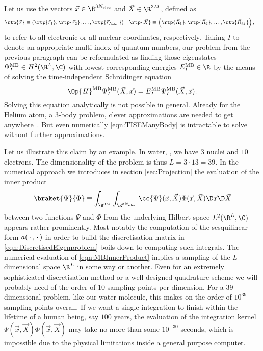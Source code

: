 Let us use the vectors $\vec{x} \in \R^{3\Nelec}$ and $\vec{X} \in \R^{3M}$, defined as
\begin{align}
	\rtp{\vec{x}} &\equiv \left(\rtp{\vec{r}_1}, \rtp{\vec{r}_2}, \ldots, \rtp{\vec{r}_{\Nelec}}\right)
	&
	\rtp{\vec{X}} &\equiv \left(\rtp{\vec{R}_1}, \rtp{\vec{R}_2}, \ldots, \rtp{\vec{R}_{M}}\right),
	\label{eqn:DefAllCoords}
\end{align}
to refer to all electronic or all nuclear coordinates, respectively.
Taking $I$ to denote an appropriate multi-index of quantum numbers,
our problem from the previous paragraph can be reformulated
as finding those eigenstates $\Psi^\text{MB}_I \in H^2(\R^L, \C)$
with lowest corresponding energies $E^\text{MB}_I \in \R$
by the means of solving the time-independent Schrödinger equation
\begin{equation}
	\Op{H}^\text{MB} \Psi_I^\text{MB}(\vec{X}, \vec{x})
	= E_I^\text{MB} \Psi_I^\text{MB}(\vec{X}, \vec{x}).
	\label{eqn:TISEManyBody}
\end{equation}
Solving this equation analytically is not possible in general.
Already for the Helium atom, a 3-body problem, clever approximations are needed
to get anywhere~\cite{Hylleraas1929}.
But even numerically \eqref{eqn:TISEManyBody} is intractable to solve
without further approximations.

Let us illustrate this claim by an example.
In water, , we have $3$ nuclei and $10$ electrons.
The dimensionality of the problem is thus $L = 3 \cdot 13 = 39$.
In the numerical approach we introduces in section \vref{sec:Projection}
the evaluation of the inner product
\begin{equation}
	\braket{\Psi}{\Phi} \equiv \int_{\R^{3M}} \int_{\R^{3\Nelec}}
		\cc{\Psi}(\vec{x}, \vec{X}) \Phi(\vec{x}, \vec{X})
	\D \vec{x} \D \vec{X}
	\label{eqn:MBInnerProduct}
\end{equation}
between two functions $\Psi$ and $\Phi$ from the
underlying Hilbert space $L^2(\R^L, \C)$ appears rather prominently.
Most notably the computation of the sesquilinear form $a(\,\cdot\,,\,\cdot\,)$
in order to build the discretisation matrix in \eqref{eqn:DiscretisedEigenproblem}
boils down to computing such integrals.
The numerical evaluation of \eqref{eqn:MBInnerProduct}
implies a sampling of the $L$-dimensional space $\R^L$ in some way or another.
Even for an extremely sophisticated discretisation method
or a well-designed quadrature scheme we will probably need of the order of
$10$ sampling points per dimension.
For a 39-dimensional problem, like our water molecule,
this makes on the order of $10^{39}$ sampling points overall.
If we want a single integration to finish within the lifetime of a human being,
say $100$ years,
the evaluation of the
integration kernel $\Psi(\vec{x}, \vec{X}) \Phi(\vec{x}, \vec{X})$
may take no more than some $10^{-30}$ seconds,
which is impossible due to the physical limitations inside a general purpose computer.

